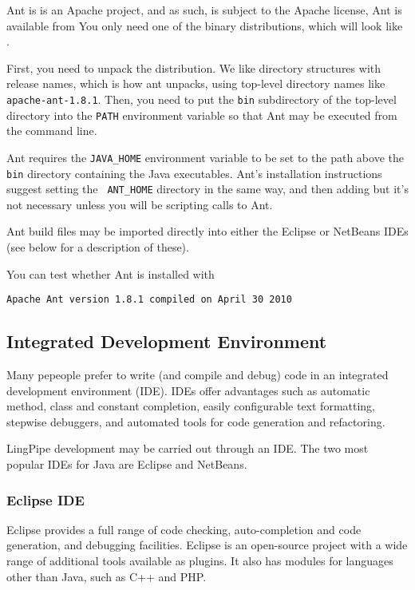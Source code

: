 Ant is is an Apache project, and as such, is subject to the Apache license,
%
%
Ant is available from 
%
%
You only need one of the binary distributions, which will
look like .

First, you need to unpack the distribution.  We like directory
structures with release names, which is how ant unpacks, using
top-level directory names like {\tt apache-ant-1.8.1}.  Then, you need
to put the {\tt bin} subdirectory of the top-level directory into the
{\tt PATH} environment variable so that Ant may be executed from the
command line.

Ant requires the {\tt JAVA\_HOME} environment variable to be set to
the path above the {\tt bin} directory containing the Java
executables.  Ant's installation instructions suggest setting the {\tt
ANT\_HOME} directory in the same way, and then adding but it's not
necessary unless you will be scripting calls to Ant.

Ant build files may be imported directly into either the Eclipse or
NetBeans IDEs (see below for a description of these).

You can test whether Ant is installed with
%
\begin{verbatim}
Apache Ant version 1.8.1 compiled on April 30 2010
\end{verbatim}


\subsection{Integrated Development Environment}

Many pepeople prefer to write (and compile and debug) code in an
integrated development environment (IDE).  IDEs offer advantages such
as automatic method, class and constant completion, easily
configurable text formatting, stepwise debuggers, and automated tools
for code generation and refactoring.

LingPipe development may be carried out through an IDE.  The two most
popular IDEs for Java are Eclipse and NetBeans.

\subsubsection{Eclipse IDE}

Eclipse provides a full range of code checking, auto-completion
and code generation, and debugging facilities.  Eclipse is an open-source
project with a wide range of additional tools available as plugins.  It
also has modules for languages other than Java, such as C++ and PHP.

